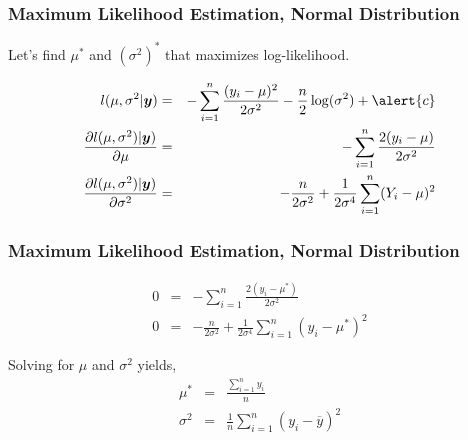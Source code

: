 \documentclass{beamer}
\begin{document}
\begin{frame}
\frametitle{Maximum Likelihood Estimation, Normal Distribution}

Let's find $\mu^{*}$ and $(\sigma^{2})^{*}$ that maximizes log-likelihood.

\begin{eqnarray}
l(\mu, \sigma^2|\boldsymbol{y} ) & = &  -\sum_{i=1}^{n} \frac{(y_{i} - \mu)^2}{2\sigma^2} - \frac{n}{2} \log (\sigma^2) + \alert{c} \nonumber \\
\frac{\partial l(\mu, \sigma^2)|\boldsymbol{y} )}{\partial \mu }  & = & -\sum_{i=1}^{n} \frac{2(y_{i} - \mu)}{2\sigma^2}  \nonumber \\
\frac{\partial l(\mu, \sigma^2)|\boldsymbol{y})}{\partial \sigma^2} & = &  -\frac{n}{2\sigma^2}  + \frac{1}{2\sigma^4} \sum_{i=1}^{n} (Y_{i} - \mu)^2 \nonumber
\end{eqnarray}


\end{frame}


\begin{frame}
\frametitle{Maximum Likelihood Estimation, Normal Distribution}


\begin{eqnarray}
0 & = & -\sum_{i=1}^{n} \frac{2(y_{i} - \mu^{*})}{2\sigma^2}  \nonumber \\
0 & = &  -\frac{n}{2\sigma^2 }  + \frac{1}{2\sigma^4} \sum_{i=1}^{n} (y_{i} - \mu^{*})^2 \nonumber
\end{eqnarray}

Solving for $\mu$ and $\sigma^2$ yields,
\begin{eqnarray}
\mu^{*} & = & \frac{\sum_{i=1}^{n} y_{i} }{n} \nonumber \\
\sigma^{2} & = & \frac{1}{n} \sum_{i=1}^{n} (y_{i} - \overline{y})^2 \nonumber
\end{eqnarray}


\end{frame}
\end{document}
